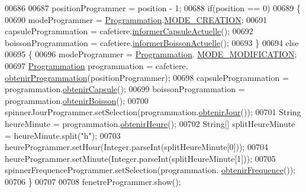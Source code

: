 \begin{DoxyCode}
00686 
00687                 positionProgrammer = position - 1;
00688                 \textcolor{keywordflow}{if}(position == 0)
00689                 \{
00690                     modeProgrammer = \hyperlink{classcom_1_1example_1_1ekawa_1_1_programmation}{Programmation}.\hyperlink{classcom_1_1example_1_1ekawa_1_1_programmation_a79242eac5d971bdb23eaf4ab930f774d}{MODE\_CREATION};
00691                     capsuleProgrammation = cafetiere.\hyperlink{classcom_1_1example_1_1ekawa_1_1_cafetiere_a3251d1865f3a4113553e1743a971984d}{informerCapsuleActuelle}();
00692                     boissonProgrammation = cafetiere.\hyperlink{classcom_1_1example_1_1ekawa_1_1_cafetiere_aa7022512d5a36d2b911722ae6400379f}{informerBoissonActuelle}();
00693                 \}
00694                 \textcolor{keywordflow}{else}
00695                 \{
00696                     modeProgrammer = \hyperlink{classcom_1_1example_1_1ekawa_1_1_programmation}{Programmation}.
      \hyperlink{classcom_1_1example_1_1ekawa_1_1_programmation_a33fb0a465e66ba5854a07e3050c12c04}{MODE\_MODIFICATION};
00697                     \hyperlink{classcom_1_1example_1_1ekawa_1_1_programmation}{Programmation} programmation = cafetiere.
      \hyperlink{classcom_1_1example_1_1ekawa_1_1_cafetiere_aaaaa95b5ed36da9d14f5aa60116a66b8}{obtenirProgrammation}(positionProgrammer);
00698                     capsuleProgrammation = programmation.\hyperlink{classcom_1_1example_1_1ekawa_1_1_programmation_a48d39b49a1250bbfaf51e4c32e934da0}{obtenirCapsule}();
00699                     boissonProgrammation = programmation.\hyperlink{classcom_1_1example_1_1ekawa_1_1_programmation_a325b9fb3bb7e041e783ecc0ed8234c20}{obtenirBoisson}();
00700                     spinnerJourProgrammer.setSelection(programmation.\hyperlink{classcom_1_1example_1_1ekawa_1_1_programmation_a0e5090c0968474d6887518b7ef659337}{obtenirJour}());
00701                     String heureMinute = programmation.\hyperlink{classcom_1_1example_1_1ekawa_1_1_programmation_ad8930be27ca5d1eed33c5e6729735897}{obtenirHeure}();
00702                     String[] splitHeureMinute = heureMinute.split(\textcolor{stringliteral}{"h"});
00703                     heureProgrammer.setHour(Integer.parseInt(splitHeureMinute[0]));
00704                     heureProgrammer.setMinute(Integer.parseInt(splitHeureMinute[1]));
00705                     spinnerFrequenceProgrammer.setSelection(programmation.
      \hyperlink{classcom_1_1example_1_1ekawa_1_1_programmation_aa23acaed287ef27f86aec2771714a15f}{obtenirFrequence}());
00706                 \}
00707 
00708                 fenetreProgrammer.show();

\end{DoxyCode}
